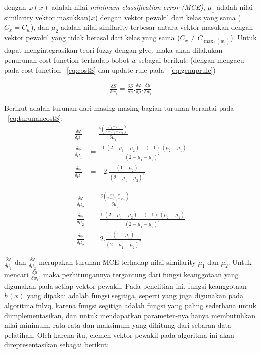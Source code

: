 dengan $\varphi(x)$ adalah nilai \emph{minimum classification error (MCE)},
$\mu_1$ adalah nilai similarity vektor masukkan($x$) dengan vektor pewakil dari
kelas yang sama ($C_x = C_w$), dan $\mu_2$ adalah nilai similarity
terbesar antara vektor masukan dengan vektor pewakil yang tidak berasal dari
kelas yang sama ($C_x \neq C_{\max_{j}(w_j)}$).  Untuk dapat mengintegrasikan
teori fuzzy dengan \gls{glvq}, maka akan dilakukan penurunan  cost function
terhadap bobot $w$ sebagai berikut; (dengan mengacu pada cost function
\equ~\ref{eq:costS} dan update rule pada \equ~\ref{eq:genuprule})

\begin{align}
\label{eq:turunancostS}
	\frac{\delta S}{\delta w_i} =  
	\frac{\delta S}{\delta \varphi} . \frac{\delta \varphi}{\delta \mu}.
	\frac{\delta \mu}{\delta w_i}
\end{align}


\noindent Berikut adalah turunan dari masing-masing bagian turunan berantai pada
\equ~\ref{eq:turunancostS}; 
\begin{align}
\label{eq:turunanmce1}
	\frac{\delta \varphi}{\delta \mu_1} &= 
	\frac{\delta \left(\frac{\mu_2-\mu_1}{2-\mu_1-\mu_2}\right)}{\delta \mu_1} 
	\nonumber \\ \frac{\delta \varphi}{\delta \mu_1} &=  
	\frac{-1 . (2 - \mu_1 - \mu_2) - (-1).(\mu_2-\mu_1)}
	{(2 - \mu_1 - \mu_2)^2} \nonumber \\
	\frac{\delta \varphi}{\delta \mu_1} &=  
	-2.\frac{(1 - \mu_2)}{(2 - \mu_1 - \mu_2)^2}
\end{align}

\begin{align}
\label{eq:turunanmce2}
	\frac{\delta \varphi}{\delta \mu_2} &= 
	\frac{\delta \left(\frac{\mu_2-\mu_1}{2-\mu_1-\mu_2}\right)}{\delta \mu_2} 
	\nonumber \\ \frac{\delta \varphi}{\delta \mu_2} &=  
	\frac{1 . (2 - \mu_1 - \mu_2) - (-1).(\mu_2-\mu_1)}
	{(2 - \mu_1 - \mu_2)^2} \nonumber \\
	\frac{\delta \varphi}{\delta \mu_2} &=  
	2.\frac{(1 - \mu_1)}{(2 - \mu_1 - \mu_2)^2}
\end{align}

$\frac{\delta \varphi}{\delta \mu_1}$ dan $\frac{\delta \varphi}{\delta
\mu_2}$ merupakan turunan MCE terhadap nilai similarity $\mu_1$ dan $\mu_2$.
Untuk mencari $\frac{\delta \mu}{\delta w_i}$, maka perhitungannya tergantung
dari fungsi keanggotaan yang digunakan pada setiap vektor pewakil. Pada
penelitian ini, fungsi keanggotaan $h(x)$ yang dipakai adalah fungsi segitiga,
seperti yang juga digunakan pada algoritma \gls{fnlvq}, karena fungsi segitiga adalah
fungsi yang paling sederhana untuk diimplementasikan, dan untuk mendapatkan
parameter-nya hanya membutuhkan nilai minimum, rata-rata dan maksimum yang
dihitung dari sebaran data pelatihan. Oleh karena itu, elemen vektor pewakil
pada algoritma ini akan direpresentasikan sebagai berikut;

